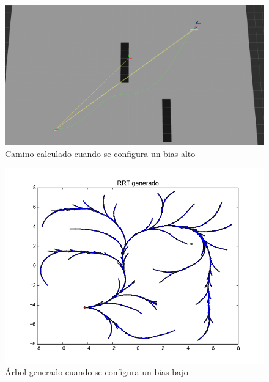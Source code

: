 \documentclass[a4paper]{article}
\theoremstyle{plain}
\theoremstyle{remark}
\theoremstyle{definition}
\begin{document}
\begin{figure}[ht]
    \begin{center}
        \includegraphics[scale=0.35]{imagenes/rviz_bias_alto.png}
        \caption{Camino calculado cuando se configura un bias alto}
    \end{center}
\end{figure}

\begin{figure}[ht]
    \begin{center}
        \includegraphics[scale=0.8]{imagenes/arbol_bias_bajo.png}
        \caption{Árbol generado cuando se configura un bias bajo}
    \end{center}
\end{figure}
\end{document}
